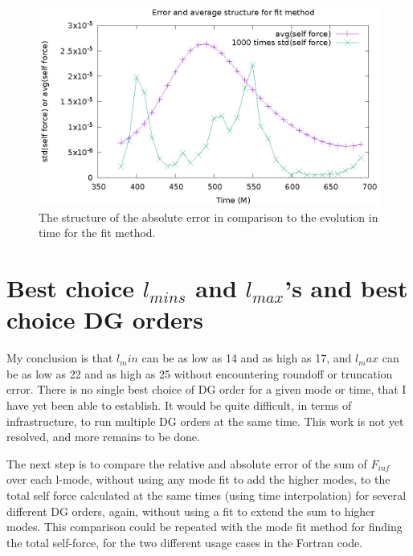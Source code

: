 \begin{figure}
  \includegraphics{structErrFitMethod}
  \caption{The structure of the absolute error in comparison to the evolution in time for the fit method.}
  \label{twopeaks}
\end{figure}


\section{Best choice $l_{mins}$ and $l_{max}$'s and best choice DG orders}

My conclusion is that $l_min$ can be as low as 14 and as high as 17, and $l_max$ can be as low as 22 and as high as 25 without encountering roundoff or truncation error. There is no single best choice of DG order for a given mode or time, that I have yet been able to establish. It would be quite difficult, in terms of infrastructure, to run multiple DG orders at the same time. This work is not yet resolved, and more remains to be done. 

The next step is to compare the relative and absolute error of the sum of $F_{inf}$ over each l-mode, without using any mode fit to add the higher modes, to the total self force calculated at the same times (using time interpolation) for several different DG orders, again, without using a fit to extend the sum to higher modes. This comparison could be repeated with the mode fit method for finding the total self-force, for the two different usage cases in the Fortran code. 
